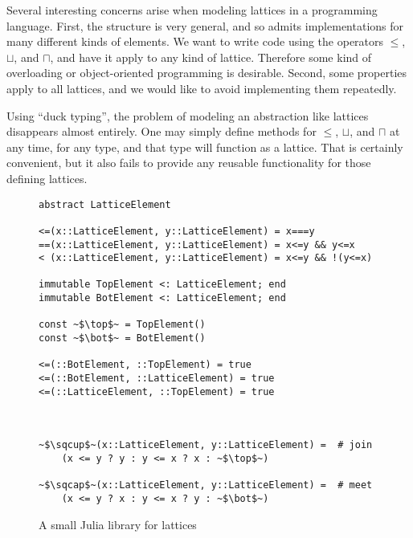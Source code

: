 Several interesting concerns arise when modeling lattices in a programming
language. First, the structure is very general, and so admits implementations
for many different kinds of elements. We want to write code using
the operators $\leq$, $\sqcup$, and $\sqcap$, and have it apply to any kind
of lattice. Therefore some kind of overloading or object-oriented programming
is desirable. Second, some properties apply to all lattices, and we would
like to avoid implementing them repeatedly.

Using ``duck typing'', the problem of modeling an abstraction like lattices
disappears almost entirely. One may simply define methods for
$\leq$, $\sqcup$, and $\sqcap$ at any time, for any type, and that type will
function as a lattice. That is certainly convenient, but it also fails to
provide any reusable functionality for those defining lattices.



\begin{figure}
  \begin{center}
\begin{singlespace}
\begin{lstlisting}[style=customjulia]
abstract LatticeElement

<=(x::LatticeElement, y::LatticeElement) = x===y
==(x::LatticeElement, y::LatticeElement) = x<=y && y<=x
< (x::LatticeElement, y::LatticeElement) = x<=y && !(y<=x)

immutable TopElement <: LatticeElement; end
immutable BotElement <: LatticeElement; end

const ~$\top$~ = TopElement()
const ~$\bot$~ = BotElement()

<=(::BotElement, ::TopElement) = true
<=(::BotElement, ::LatticeElement) = true
<=(::LatticeElement, ::TopElement) = true



~$\sqcup$~(x::LatticeElement, y::LatticeElement) =  # join
    (x <= y ? y : y <= x ? x : ~$\top$~)

~$\sqcap$~(x::LatticeElement, y::LatticeElement) =  # meet
    (x <= y ? x : y <= x ? y : ~$\bot$~)
\end{lstlisting}
\end{singlespace}
  \end{center}
  \label{julialattices}
  \caption{A small Julia library for lattices}
\end{figure}





